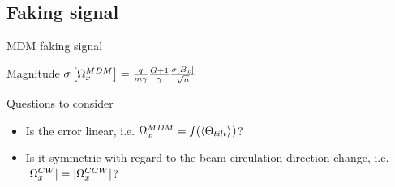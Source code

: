 \documentclass[14pt]{beamer}
\begin{document}
\subsection{Faking signal}
\begin{frame}{MDM faking signal}
	\begin{block}{Magnitude}
		$\SD{\W_x^{MDM}} = \frac{q}{m\gamma}\frac{G+1}{\gamma}\frac{\SD{B_x}}{\sqrt{n}}$
	\end{block}
	\begin{block}{Questions to consider}
		\begin{itemize}
			\item Is the error linear, i.e. $\W_x^{MDM} = f(\avg{\Theta_{tilt}})$?
			\item Is it symmetric with regard to the beam circulation direction change, i.e. $|\Omega_x^{CW}| = |\Omega_x^{CCW}|$?
		\end{itemize}
	\end{block}
\end{frame}
\end{document}
